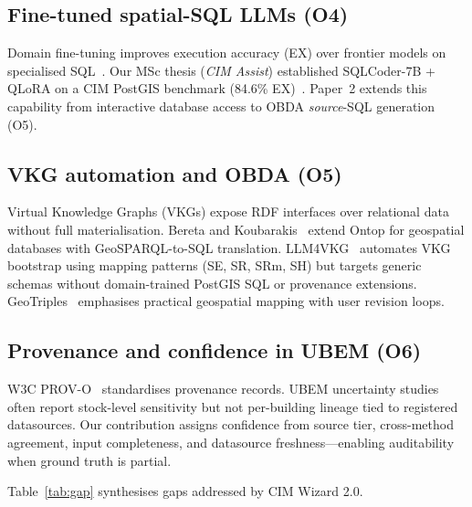 \subsection{Fine-tuned spatial-SQL LLMs (O4)}

Domain fine-tuning improves execution accuracy (EX) over frontier models on specialised SQL~\cite{survey_llm_t2sql_liu2025,wang_spatial_ijgi}.
Our MSc thesis (\emph{CIM Assist}) established SQLCoder-7B + QLoRA on a CIM PostGIS benchmark (84.6\% EX)~\cite{taherdoust2025cimassist,dettmers2023qlora}.
Paper~2 extends this capability from interactive database access to OBDA \emph{source}-SQL generation (O5).

\subsection{VKG automation and OBDA (O5)}

Virtual Knowledge Graphs (VKGs) expose RDF interfaces over relational data without full materialisation.
Bereta and Koubarakis~\cite{bereta2016ontop} extend Ontop for geospatial databases with GeoSPARQL-to-SQL translation.
LLM4VKG~\cite{xiao2025llm4vkg} automates VKG bootstrap using mapping patterns (SE, SR, SRm, SH) but targets generic schemas without domain-trained PostGIS SQL or provenance extensions.
GeoTriples~\cite{kyzirakos2018geotriples} emphasises practical geospatial mapping with user revision loops.

\subsection{Provenance and confidence in UBEM (O6)}

W3C PROV-O~\cite{prov-o} standardises provenance records.
UBEM uncertainty studies often report stock-level sensitivity but not per-building lineage tied to registered datasources.
Our contribution assigns confidence from source tier, cross-method agreement, input completeness, and datasource freshness---enabling auditability when ground truth is partial.

Table~\ref{tab:gap} synthesises gaps addressed by CIM Wizard 2.0.


